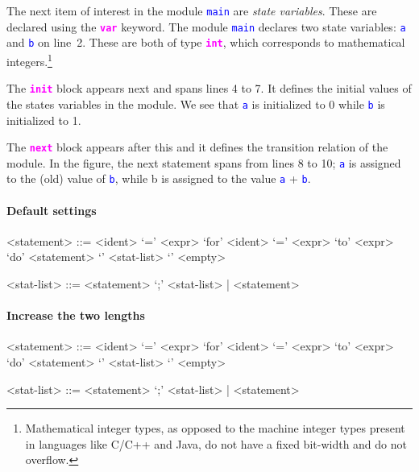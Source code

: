 \documentclass{article}
\newcommand{\ident}[1]{\textcolor{blue}{\texttt{#1}}}
\newcommand{\keywordbf}[1]{\textcolor{magenta}{\texttt{\textbf{#1}}}}
\begin{document}
The next item of interest in the module \ident{main} are \emph{state variables}. These are declared using the \keywordbf{var} keyword. The module \ident{main} declares two state variables: \ident{a} and \ident{b} on line~2. These are both of type \keywordbf{int}, which corresponds to mathematical integers.\footnote{Mathematical integer types, as opposed to the machine integer types present in languages like C/C++ and Java, do not have a fixed bit-width and do not overflow.}

The \keywordbf{init} block appears next and spans lines 4 to 7. It defines the initial values of the states variables in the module. We see that \ident{a} is initialized to 0 while \ident{b} is initialized to 1.

The \keywordbf{next} block appears after this and it defines the transition relation of the module. In the figure, the next statement spans from lines 8 to 10; \ident{a} is assigned to the (old) value of \ident{b}, while b is assigned to the value \ident{a} + \ident{b}. 

\paragraph{Default settings}
\begin{grammar}

<statement> ::= <ident> `=' <expr> 
\alt `for' <ident> `=' <expr> `to' <expr> `do' <statement> 
\alt `{' <stat-list> `}' 
\alt <empty> 

<stat-list> ::= <statement> `;' <stat-list> | <statement> 

\end{grammar}
\paragraph{Increase the two lengths}
\setlength{\grammarparsep}{20pt plus 1pt minus 1pt} %
\setlength{\grammarindent}{12em} %

\begin{grammar}

<statement> ::= <ident> `=' <expr> 
\alt `for' <ident> `=' <expr> `to' <expr> `do' <statement> 
\alt `{' <stat-list> `}' 
\alt <empty> 

<stat-list> ::= <statement> `;' <stat-list> | <statement> 

\end{grammar}
\end{document}
